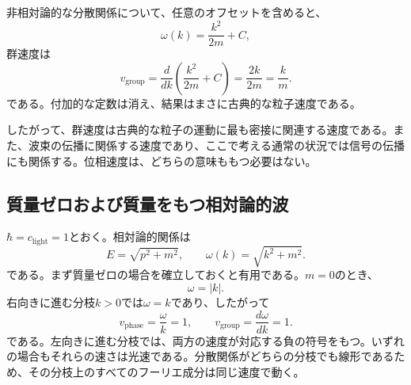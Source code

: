 非相対論的な分散関係について、任意のオフセットを含めると、
\begin{equation}
\omega(k)=\frac{k^2}{2m}+C,
\end{equation}
群速度は
\begin{equation}
v_{\mathrm{group}}
=\frac{d}{dk}\left(\frac{k^2}{2m}+C\right)
=\frac{2k}{2m}
=\frac{k}{m}.
\end{equation}
である。付加的な定数は消え、結果はまさに古典的な粒子速度である。

\begin{classroomqa}
\end{classroomqa}

したがって、群速度は古典的な粒子の運動に最も密接に関連する速度である。また、波束の伝播に関係する速度であり、ここで考える通常の状況では信号の伝播にも関係する。位相速度は、どちらの意味ももつ必要はない。

\subsection{質量ゼロおよび質量をもつ相対論的波}

\begin{classroomqa}
\end{classroomqa}

\begin{classroomqa}
\end{classroomqa}

\(\hbar=c_{\mathrm{light}}=1\)とおく。相対論的関係は
\begin{equation}
E=\sqrt{p^2+m^2},
\qquad
\omega(k)=\sqrt{k^2+m^2}.
\end{equation}
である。まず質量ゼロの場合を確立しておくと有用である。\(m=0\)のとき、
\begin{equation}
\omega=|k|.
\end{equation}
右向きに進む分枝\(k>0\)では\(\omega=k\)であり、したがって
\begin{equation}
v_{\mathrm{phase}}=\frac{\omega}{k}=1,
\qquad
v_{\mathrm{group}}=\frac{d\omega}{dk}=1.
\end{equation}
である。左向きに進む分枝では、両方の速度が対応する負の符号をもつ。いずれの場合もそれらの速さは光速である。分散関係がどちらの分枝でも線形であるため、その分枝上のすべてのフーリエ成分は同じ速度で動く。

